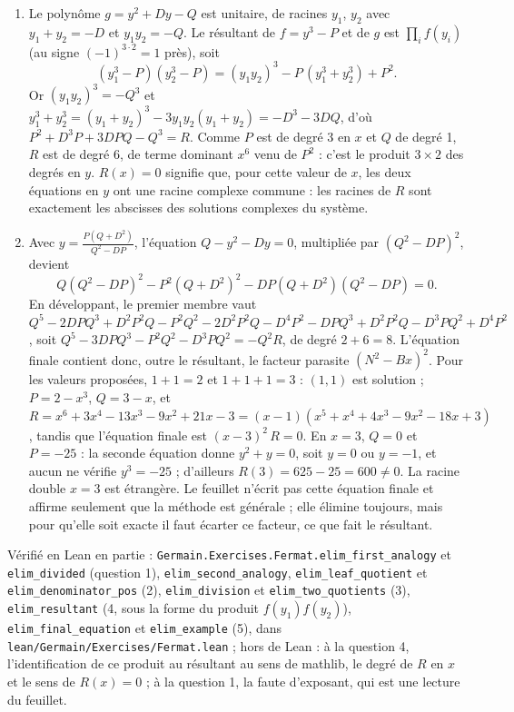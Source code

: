 \documentclass[11pt,a4paper]{article}
\begin{document}
\begin{solution}
\begin{enumerate}
\item Le polynôme $g = y^2 + Dy - Q$ est unitaire, de racines $y_1$, $y_2$ avec
  $y_1 + y_2 = -D$ et $y_1y_2 = -Q$. Le résultant de $f = y^3 - P$ et de $g$
  est $\prod_i f(y_i)$ (au signe $(-1)^{3 \cdot 2} = 1$ près), soit
  \[ (y_1^3 - P)(y_2^3 - P) = (y_1y_2)^3 - P\,(y_1^3 + y_2^3) + P^2 . \]
  Or $(y_1y_2)^3 = -Q^3$ et
  $y_1^3 + y_2^3 = (y_1 + y_2)^3 - 3y_1y_2(y_1 + y_2) = -D^3 - 3DQ$, d'où
  $P^2 + D^3P + 3DPQ - Q^3 = R$. Comme $P$ est de degré 3 en $x$ et $Q$ de degré
  1, $R$ est de degré 6, de terme dominant $x^6$ venu de $P^2$ : c'est le
  produit $3 \times 2$ des degrés en $y$. $R(x) = 0$ signifie que, pour cette
  valeur de $x$, les deux équations en $y$ ont une racine complexe commune : les
  racines de $R$ sont exactement les abscisses des solutions complexes du
  système.
\item Avec $y = \frac{P(Q + D^2)}{Q^2 - DP}$, l'équation $Q - y^2 - Dy = 0$,
  multipliée par $(Q^2 - DP)^2$, devient
  \[ Q(Q^2 - DP)^2 - P^2(Q + D^2)^2 - DP(Q + D^2)(Q^2 - DP) = 0 . \]
  En développant, le premier membre vaut
  $Q^5 - 2DPQ^3 + D^2P^2Q - P^2Q^2 - 2D^2P^2Q - D^4P^2
  - DPQ^3 + D^2P^2Q - D^3PQ^2 + D^4P^2$, soit
  $Q^5 - 3DPQ^3 - P^2Q^2 - D^3PQ^2 = -Q^2R$, de degré $2 + 6 = 8$. L'équation
  finale contient donc, outre le résultant, le facteur parasite
  $(N^2 - Bx)^2$. Pour les valeurs proposées, $1 + 1 = 2$ et $1 + 1 + 1 = 3$ :
  $(1, 1)$ est solution ; $P = 2 - x^3$, $Q = 3 - x$, et
  $R = x^6 + 3x^4 - 13x^3 - 9x^2 + 21x - 3
  = (x - 1)(x^5 + x^4 + 4x^3 - 9x^2 - 18x + 3)$, tandis que l'équation finale
  est $(x - 3)^2\,R = 0$. En $x = 3$, $Q = 0$ et $P = -25$ : la seconde équation
  donne $y^2 + y = 0$, soit $y = 0$ ou $y = -1$, et aucun ne vérifie
  $y^3 = -25$ ; d'ailleurs $R(3) = 625 - 25 = 600 \neq 0$. La racine double
  $x = 3$ est étrangère. Le feuillet n'écrit pas cette équation finale et
  affirme seulement que la méthode est générale ; elle élimine toujours, mais
  pour qu'elle soit exacte il faut écarter ce facteur, ce que fait le
  résultant.
\end{enumerate}

Vérifié en Lean en partie : \texttt{Germain.Exercises.Fermat.elim\_first\_analogy} et
\texttt{elim\_divided} (question 1), \texttt{elim\_second\_analogy}, \texttt{elim\_leaf\_quotient}
et \texttt{elim\_denominator\_pos} (2), \texttt{elim\_division} et \texttt{elim\_two\_quotients}
(3), \texttt{elim\_resultant} (4, sous la forme du produit $f(y_1)f(y_2)$),
\texttt{elim\_final\_equation} et \texttt{elim\_example} (5), dans \texttt{lean/Germain/Exercises/Fermat.lean} ; hors de
Lean : à la question 4, l'identification de ce produit au résultant au sens de mathlib, le degré
de $R$ en $x$ et le sens de $R(x) = 0$ ; à la question 1, la faute d'exposant, qui est une
lecture du feuillet.
\end{solution}
\end{document}
